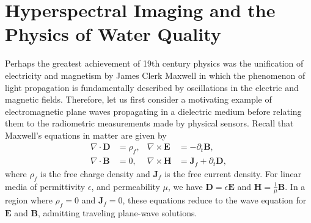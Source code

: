 


\section{Hyperspectral Imaging and the Physics of Water Quality}\label{sec:imaging}

Perhaps the greatest achievement of 19th century physics was the unification of
electricity and magnetism by James Clerk Maxwell in which the phenomenon of
light propagation is fundamentally described by oscillations in the electric and
magnetic fields. Therefore, let us first consider a motivating example of
electromagnetic plane waves propagating in a dielectric medium before relating them to
the radiometric measurements made by physical sensors. Recall that Maxwell's
equations in matter are given by
\begin{equation}\label{eq:maxwell}
  \begin{aligned}
    \nabla \cdot \mathbf{D} &= \rho_f, & \nabla \times \mathbf{E} &= - \partial_t \mathbf{B}, \\
    \nabla \cdot \mathbf{B} &= 0, & \nabla \times \mathbf{H} &= \mathbf{J}_f + \partial_t\mathbf{D},
  \end{aligned}
\end{equation}
where $\rho_f$ is the free charge density and $\mathbf{J}_f$ is the free current
density. For linear media of permittivity $\epsilon$, and permeability $\mu$, we
have $\mathbf{D}=\epsilon\mathbf{E}$ and $\mathbf{H}=\frac{1}{\mu}\mathbf{B}$.
In a region where $\rho_f=0$ and $\mathbf{J}_f=0$, these equations reduce to the
wave equation for $\mathbf{E}$ and $\mathbf{B}$, admitting traveling plane-wave
solutions.

